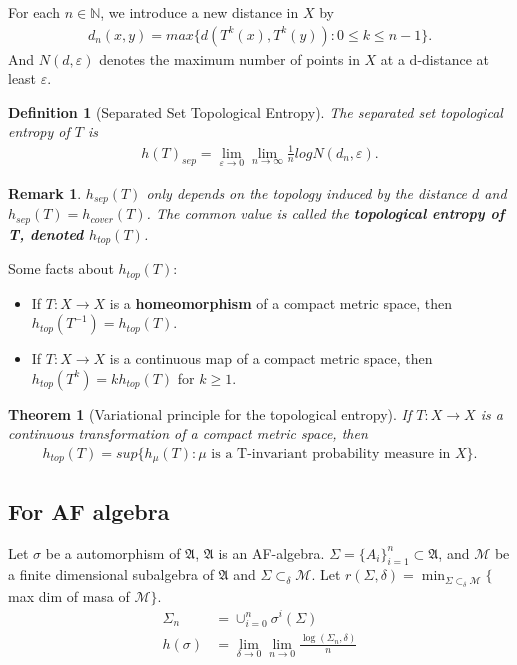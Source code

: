 \documentclass[a4paper,10pt]{amsart}
\newtheorem{theorem}{Theorem}[section]
\newtheorem{definition}{Definition}[section]
\newtheorem{remark}{Remark}[section]
\newcommand{\AAA}{\mathfrak A}
\newcommand{\N}{\mathbb N} %
\begin{document}
For each $n \in \N$,
we introduce a new distance in $X$ by
\begin{align*}
    d_n(x,y) = max\{d(T^{k}(x), T^{k}(y)): 0 \leq k \leq n-1 \}. 
\end{align*}
And $N(d, \varepsilon)$ denotes the maximum number of points in $X$ at 
a d-distance at least $\varepsilon$.

\begin{definition}[Separated Set Topological Entropy]
   The separated set topological entropy of $T$ is 
   \begin{align*}
       h(T)_{sep} =
       \lim_{\varepsilon \rightarrow 0}\lim_{n \rightarrow \infty}
       \frac{1}{n}logN(d_n, \varepsilon).
   \end{align*}
\end{definition}

\begin{remark}
    $h_{sep}(T)$ only depends on the topology induced by the distance $d$ 
    and $h_{sep}(T) = h_{cover}(T)$. The common value is called the 
    \textbf{topological entropy of T, denoted $h_{top}(T)$}.
\end{remark}

Some facts about $h_{top}(T)$:
\begin{itemize}
    \item If $T: X \rightarrow X$ is a \textbf{homeomorphism} of a 
        compact metric space, then $h_{top}(T^{-1}) = h_{top}(T)$.
    \item If $T: X \rightarrow X$ is a continuous map of a  
        compact metric space, then $h_{top}(T^{k}) = kh_{top}(T)$ for
        $k \geq 1$.
\end{itemize}

\begin{theorem}[Variational principle for the topological entropy]
   If $T : X \rightarrow X$ is a continuous transformation of 
   a compact metric space, then
   \begin{align*}
       h_{top}(T) = 
       sup\{h_{\mu}(T): \mu \mbox{ is a T-invariant probability 
       measure in $X$} \}.
   \end{align*}
\end{theorem}

\subsection{For AF algebra}
Let $\sigma$ be a automorphism of $\AAA$, $\AAA$ is an AF-algebra.
$\Sigma = \{A_i\}_{i=1}^{n} \subset \AAA$, and $\mathcal{M}$ be a finite dimensional
subalgebra of $\AAA$ and $\Sigma \subset_{\delta}\mathcal{M}$.
Let $r(\Sigma, \delta) = \min_{\Sigma \subset_{\delta} \mathcal{M}}
\{ $ max dim of masa of $\mathcal{M} \}$.
\begin{align*}
    \Sigma_{n}& = \cup_{i=0}^{n}\sigma^{i}(\Sigma)\\ 
    h(\sigma) &= \lim_{\delta \rightarrow 0}\lim_{n \rightarrow 0}
    \frac{\log(\Sigma_n, \delta)}{n}
\end{align*}
\end{document}
